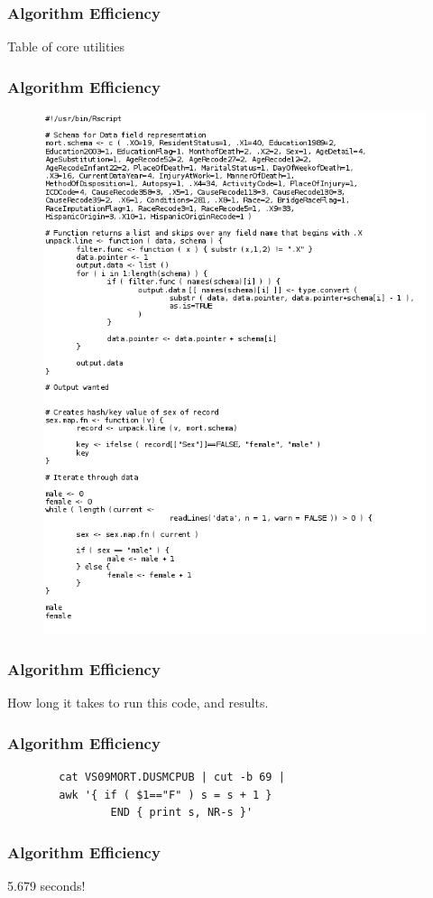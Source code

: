 \begin{frame}
		\frametitle{Algorithm Efficiency}
		Table of core utilities
\end{frame}

\begin{frame}
		\frametitle{Algorithm Efficiency}
		\begin{figure}
		\includegraphics[width=0.5\linewidth]{figures/diagrams/tabular/tabularRcode}
		\end{figure}
\end{frame}

\begin{frame}
		\frametitle{Algorithm Efficiency}
		How long it takes to run this code, and results.
\end{frame}

\begin{frame}[fragile]
		\frametitle{Algorithm Efficiency}
		\begin{verbatim}
		cat VS09MORT.DUSMCPUB | cut -b 69 | 
		awk '{ if ( $1=="F" ) s = s + 1 } 
		        END { print s, NR-s }'
		\end{verbatim}
\end{frame}

\begin{frame}
		\frametitle{Algorithm Efficiency}
		\Huge{\centerline{5.679 seconds!}}
\end{frame}
